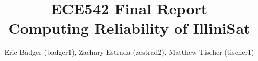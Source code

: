 \documentclass[notitlepage,groupedaddress]{IEEEtran}
\begin{document}
\title{ECE542 Final Report\\ Computing Reliability of IlliniSat}
\author{Eric Badger (badger1), Zachary Estrada (zestrad2), Matthew Tischer
(tischer1)}

\maketitle
















\end{document}
